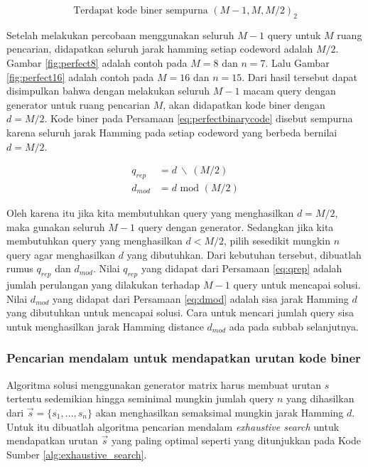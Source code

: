 \begin{equation}
\label{eq:perfectbinarycode}
\text{Terdapat kode biner sempurna }(M-1, M, M/2)_2
\end{equation}

Setelah melakukan percobaan menggunakan seluruh $M-1$ query untuk $M$ ruang pencarian, didapatkan seluruh jarak hamming setiap codeword adalah $M/2$. Gambar \ref{fig:perfect8} adalah contoh pada $M=8$ dan $n=7$. Lalu Gambar \ref{fig:perfect16} adalah contoh pada $M=16$ dan $n=15$. Dari hasil tersebut dapat disimpulkan bahwa dengan melakukan seluruh $M-1$ macam query dengan generator untuk ruang pencarian $M$, akan didapatkan kode biner dengan $d=M/2$. Kode biner pada Persamaan \ref{eq:perfectbinarycode} disebut sempurna karena seluruh jarak Hamming pada setiap codeword yang berbeda bernilai $d = M/2$.

\begin{align}
q_{rep} &= d\ \backslash\ (M/2) \label{eq:qrep} \\
d_{mod} &= d \text{ mod } (M/2) \label{eq:dmod}
\end{align}

Oleh karena itu jika kita membutuhkan query yang menghasilkan $d = M/2$, maka gunakan seluruh $M-1$ query dengan generator. Sedangkan jika kita membutuhkan query yang menghasilkan $d < M/2$, pilih sesedikit mungkin $n$ query agar menghasilkan $d$ yang dibutuhkan. Dari kebutuhan tersebut, dibuatlah rumus $q_{rep}$ dan $d_{mod}$. Nilai $q_{rep}$ yang didapat dari Persamaan \ref{eq:qrep} adalah jumlah perulangan yang dilakukan terhadap $M-1$ query untuk mencapai solusi. Nilai $d_{mod}$ yang didapat dari Persamaan \ref{eq:dmod} adalah sisa jarak Hamming $d$ yang dibutuhkan untuk mencapai solusi. Cara untuk mencari jumlah query sisa untuk menghasilkan jarak Hamming distance $d_{mod}$ ada pada subbab selanjutnya.

\subsubsection{Pencarian mendalam untuk mendapatkan urutan kode biner}

Algoritma solusi menggunakan generator matrix harus membuat urutan $s$ tertentu sedemikian hingga seminimal mungkin jumlah query $n$ yang dihasilkan dari $\vec{s} = \{s_1, \ldots, s_n\}$ akan menghasilkan semaksimal mungkin jarak Hamming $d$. Untuk itu dibuatlah algoritma pencarian mendalam \textit{exhaustive search} untuk mendapatkan urutan $\vec{s}$ yang paling optimal seperti yang ditunjukkan pada Kode Sumber \ref{alg:exhaustive_search}.

